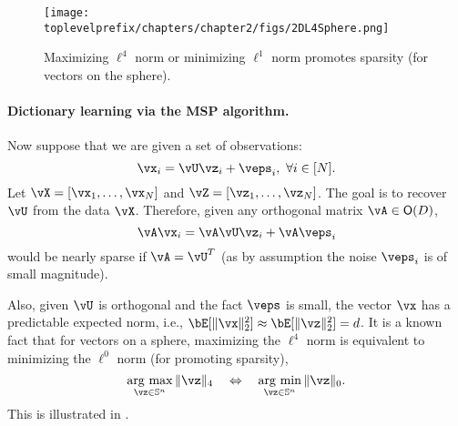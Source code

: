\documentclass[../../book-main.tex]{subfiles}
\begin{document}
\begin{figure}
    \centering
    \texttt{[image: \\toplevelprefix/chapters/chapter2/figs/2DL4Sphere.png]}\vspace{-0.1in}
    \caption{Maximizing $\ell^4$ norm or minimizing $\ell^1$ norm promotes sparsity (for vectors on the sphere).}
    \label{fig:L4-sphere}
\end{figure}


\paragraph{Dictionary learning via the MSP algorithm.}

Now suppose that we are given a set of observations:
\begin{equation}
    \vx_i = \vU \vz_i + \veps_i,\ \forall i \in [N].
\end{equation}
Let $\vX = [\vx_1, \dots, \vx_N]$ and $\vZ = [\vz_1, \dots, \vz_N]$. The goal is to recover $\vU$ from the data $\vX$. Therefore, given any orthogonal matrix $\vA \in \O(D)$, 
\begin{equation}
    \vA\vx_i = \vA\vU \vz_i + \vA\veps_i
\end{equation}
would be nearly sparse if $\vA = \vU^T$ (as by assumption the noise $\veps_i$ is of small magnitude). 

Also, given $\vU$ is orthogonal and the fact $\veps$ is small, the vector $\vx$ has a predictable expected norm, i.e., $\bE[\norm{\vx}_2^2] \approx \bE[\norm{\vz}_2^2]=d$. It is a known fact that for vectors on a sphere, maximizing the $\ell^4$ norm is equivalent to minimizing the $\ell^0$ norm (for promoting sparsity),
\begin{equation}
    \argmax_{\vz \in \mathbb{S}^n}\|\vz\|_{4}\quad\Leftrightarrow\quad \argmin_{\vz \in \mathbb{S}^n}\|\vz\|_{0}.
\end{equation}
This is illustrated in .
\end{document}
